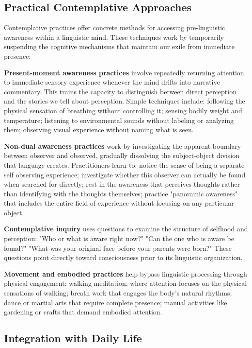 \subsection{Practical Contemplative Approaches}

Contemplative practices offer concrete methods for accessing pre-linguistic awareness within a linguistic mind. These techniques work by temporarily suspending the cognitive mechanisms that maintain our exile from immediate presence:

\textbf{Present-moment awareness practices} involve repeatedly returning attention to immediate sensory experience whenever the mind drifts into narrative commentary. This trains the capacity to distinguish between direct perception and the stories we tell about perception. Simple techniques include: following the physical sensation of breathing without controlling it; sensing bodily weight and temperature; listening to environmental sounds without labeling or analyzing them; observing visual experience without naming what is seen.

\textbf{Non-dual awareness practices} work by investigating the apparent boundary between observer and observed, gradually dissolving the subject-object division that language creates. Practitioners learn to: notice the sense of being a separate self observing experience; investigate whether this observer can actually be found when searched for directly; rest in the awareness that perceives thoughts rather than identifying with the thoughts themselves; practice "panoramic awareness" that includes the entire field of experience without focusing on any particular object.

\textbf{Contemplative inquiry} uses questions to examine the structure of selfhood and perception: "Who or what is aware right now?" "Can the one who is aware be found?" "What was your original face before your parents were born?" These questions point directly toward consciousness prior to its linguistic organization.

\textbf{Movement and embodied practices} help bypass linguistic processing through physical engagement: walking meditation, where attention focuses on the physical sensations of walking; breath work that engages the body's natural rhythms; dance or martial arts that require complete presence; manual activities like gardening or crafts that demand embodied attention.

\subsection{Integration with Daily Life}

